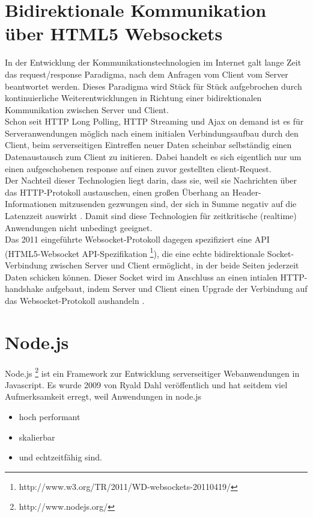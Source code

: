 \section{Bidirektionale Kommunikation über HTML5 Websockets}\label{s.Websockets}
In der Entwicklung der Kommunikationstechnologien im Internet galt lange Zeit das request/response Paradigma, nach dem Anfragen vom Client vom Server beantwortet werden. Dieses Paradigma wird Stück für Stück aufgebrochen durch kontinuierliche Weiterentwicklungen in Richtung einer bidirektionalen Kommunikation zwischen Server und Client.\\
Schon seit HTTP Long Polling, HTTP Streaming und Ajax on demand ist es für Serveranwendungen möglich nach einem initialen Verbindungsaufbau durch den Client, beim serverseitigen Eintreffen neuer Daten scheinbar selbständig einen Datenaustausch zum Client zu initieren. Dabei handelt es sich eigentlich nur um einen aufgeschobenen response auf einen zuvor gestellten client-Request.\\
Der Nachteil dieser Technologien liegt darin, dass sie, weil sie Nachrichten über das HTTP-Protokoll austauschen, einen großen Überhang an Header-Informationen mitzusenden gezwungen sind, der sich in Summe negativ auf die Latenzzeit auswirkt \cite{varaksin}. Damit sind diese Technologien für zeitkritische (realtime) Anwendungen nicht unbedingt geeignet.
\\
Das 2011 eingeführte Websocket-Protokoll dagegen spezifiziert eine API (HTML5-Websocket API-Spezifikation \footnote{http://www.w3.org/TR/2011/WD-websockets-20110419/}), die eine echte bidirektionale Socket-Verbindung zwischen Server und Client ermöglicht, in der beide Seiten jederzeit Daten schicken können. Dieser Socket wird im Anschluss an einen intialen HTTP-handshake aufgebaut, indem Server und Client  einen Upgrade der Verbindung auf das Websocket-Protokoll aushandeln  \cite{html5rocks}. 

\section{Node.js}\label{Node.js}
Node.js \footnote{http://www.nodejs.org/} ist ein Framework zur Entwicklung serverseitiger Webanwendungen in Javascript. Es wurde 2009 von Ryald Dahl veröffentlich und hat seitdem viel Aufmerksamkeit erregt, weil Anwendungen in node.js
\begin{itemize}

\item hoch performant
\item skalierbar
\item und echtzeitfähig sind.
\end{itemize}

